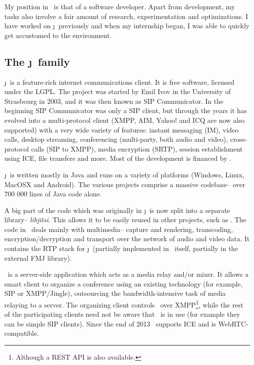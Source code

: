 \documentclass[twoside,openright,a4paper,12pt,english]{article}
\begin{document}
My position in \bj\ is that of a software developer. Apart from development, my tasks also 
involve a fair amount of research, experimentation and optimizations. I have
worked on \j\ previously and when my internship began, I was able to quickly
get accustomed to the environment. 




\subsection{The \j\ family}
\label{intro-jitsi}

\j\ is a feature-rich internet communications client.
It is free software, licensed under the LGPL\cite{lgpl}.
The project was started by Emil Ivov in
the University of Strasbourg in 2003, and it was then known as SIP
Communicator. In the beginning
SIP Communicator was only a SIP client, but through the years it has evolved
into a multi-protocol
client (XMPP, AIM, Yahoo! and ICQ are now also supported) with a very wide variety
of features: instant messaging (IM), video calls, desktop streaming,
conferencing (multi-party, both audio and video), cross-protocol calls (SIP to
XMPP), media encryption (SRTP),
session establishment using ICE, file transfers and more.
Most of the development is financed by \bj.

\j\ is written mostly in Java and runs on a variety of
platforms (Windows, Linux, MacOSX and Android). The various projects comprise a massive codebase--
over 700 000 lines of Java code alone.

A big part of the code which was originally in \j\ is now split into a
separate library-- \emph{libjitsi}. This allows it to be easily reused in other
projects, such as \jvb. The code in \lj\ deals mainly with multimedia-- capture
and rendering, transcoding, encryption/decryption and transport over the
network of audio and video data. It contains the RTP stack for \j\ (partially
implemented in \lj\ itself, partially in the external FMJ library).

\jvb\ is a server-side application which acts as a media
relay and/or mixer. It allows a smart client to organize a conference
using an existing technology (for example, SIP or XMPP/Jingle), outsourcing the bandwidth-intensive task of media relaying to a server. 
The organizing client controls \jvb\ over XMPP\footnote{Although a REST API is also available.}, while the rest of the
participating clients need not be aware that \jvb\ is in use (for example they
can be simple SIP clients). Since the end of 2013 \jvb\ supports ICE and is WebRTC-compatible.
\end{document}
